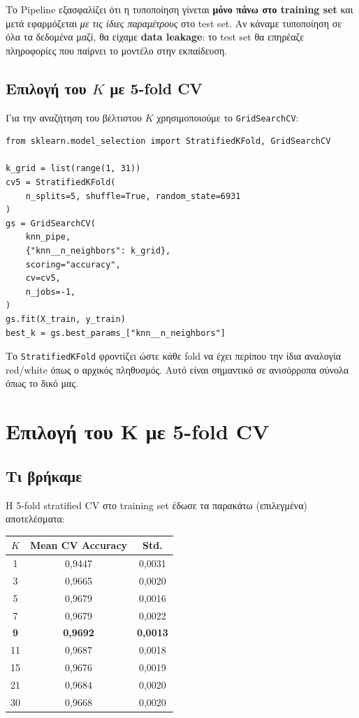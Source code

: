 \documentclass[11pt,a4paper]{article}
\newcommand{\code}[1]{\texttt{#1}}
\begin{document}
Το Pipeline εξασφαλίζει ότι η τυποποίηση γίνεται \textbf{μόνο πάνω στο
training set} και μετά εφαρμόζεται \emph{με τις ίδιες παραμέτρους} στο
test set. Αν κάναμε τυποποίηση σε όλα τα δεδομένα μαζί, θα είχαμε
\textbf{data leakage}: το test set θα επηρέαζε πληροφορίες που
παίρνει το μοντέλο στην εκπαίδευση.

\subsection{Επιλογή του \(K\) με 5-fold CV}

Για την αναζήτηση του βέλτιστου \(K\) χρησιμοποιούμε το
\code{GridSearchCV}:
\begin{lstlisting}
from sklearn.model_selection import StratifiedKFold, GridSearchCV

k_grid = list(range(1, 31))
cv5 = StratifiedKFold(
    n_splits=5, shuffle=True, random_state=6931
)
gs = GridSearchCV(
    knn_pipe,
    {"knn__n_neighbors": k_grid},
    scoring="accuracy",
    cv=cv5,
    n_jobs=-1,
)
gs.fit(X_train, y_train)
best_k = gs.best_params_["knn__n_neighbors"]
\end{lstlisting}

Το \code{StratifiedKFold} φροντίζει ώστε κάθε fold να έχει περίπου την
ίδια αναλογία red/white όπως ο αρχικός πληθυσμός. Αυτό είναι σημαντικό
σε ανισόρροπα σύνολα όπως το δικό μας.

\section{Επιλογή του K με 5-fold CV}

\subsection{Τι βρήκαμε}

Η 5-fold stratified CV στο training set έδωσε τα παρακάτω (επιλεγμένα)
αποτελέσματα:
\begin{center}
{\small
\begin{tabular}{ccc}
\toprule
\(K\) & Mean CV Accuracy & Std. \\
\midrule
1 & 0,9447 & 0,0031 \\
3 & 0,9665 & 0,0020 \\
5 & 0,9679 & 0,0016 \\
7 & 0,9679 & 0,0022 \\
\textbf{9} & \textbf{0,9692} & \textbf{0,0013} \\
11 & 0,9687 & 0,0018 \\
15 & 0,9676 & 0,0019 \\
21 & 0,9684 & 0,0020 \\
30 & 0,9668 & 0,0020 \\
\bottomrule
\end{tabular}
}
\end{center}
\end{document}
